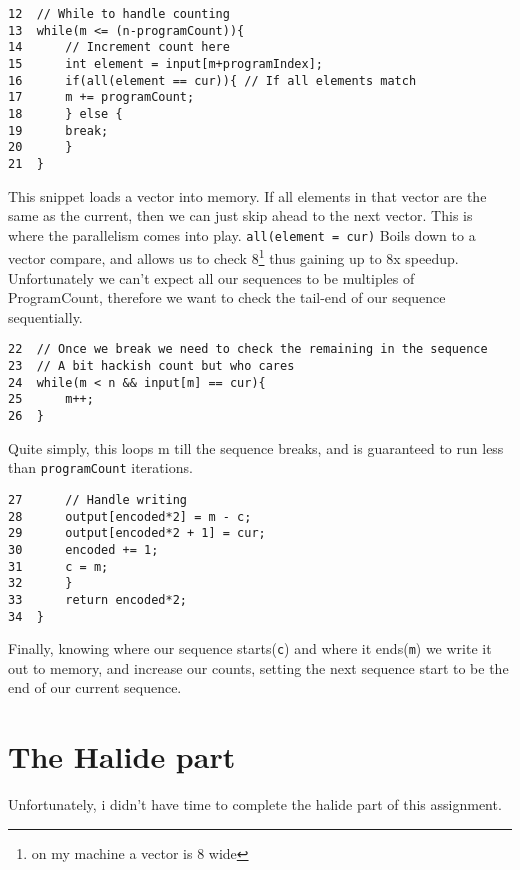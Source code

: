 \documentclass[11pt]{article}
\begin{document}
\begin{verbatim}
12  // While to handle counting
13  while(m <= (n-programCount)){
14      // Increment count here
15      int element = input[m+programIndex];
16      if(all(element == cur)){ // If all elements match
17  	m += programCount; 
18      } else {
19  	break;
20      }
21  }
\end{verbatim}
This snippet loads a vector into memory. If all elements in that vector are the same
as the current, then we can just skip ahead to the next vector. This is where the parallelism
comes into play. \texttt{all(element = cur)} Boils down to a vector compare, and allows us to check
8\footnote{on my machine a vector is 8 wide} thus gaining up to 8x speedup. Unfortunately we can't
expect all our sequences to be multiples of ProgramCount, therefore we want to check the 
tail-end of our sequence sequentially.
\begin{verbatim}
22  // Once we break we need to check the remaining in the sequence
23  // A bit hackish count but who cares
24  while(m < n && input[m] == cur){
25      m++;
26  }
\end{verbatim}
Quite simply, this loops m till the sequence breaks, and is guaranteed to run less than
\texttt{programCount} iterations. 
\begin{verbatim}
27  	// Handle writing
28  	output[encoded*2] = m - c;
29  	output[encoded*2 + 1] = cur;
30  	encoded += 1;
31  	c = m;
32      }
33      return encoded*2;
34  }
\end{verbatim}
Finally, knowing where our sequence starts(\texttt{c}) and where it ends(\texttt{m}) we write it out
to memory, and increase our counts, setting the next sequence start to be the end of our current
sequence.

\section{The Halide part}
\label{sec:orga4dd610}
Unfortunately, i didn't have time to complete the halide part of this assignment.
\end{document}
